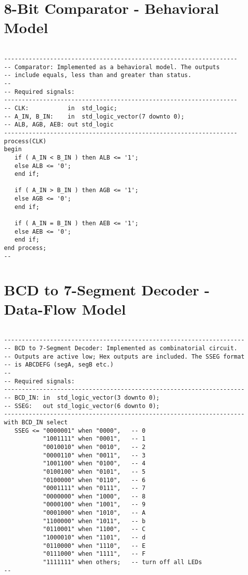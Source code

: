 \section{8-Bit Comparator - Behavioral Model}

\noindent
\begin{minipage}{0.99\linewidth}
\begin{lstlisting}

------------------------------------------------------------------
-- Comparator: Implemented as a behavioral model. The outputs
-- include equals, less than and greater than status.
--
-- Required signals:
------------------------------------------------------------------
-- CLK:           in  std_logic;
-- A_IN, B_IN:    in  std_logic_vector(7 downto 0);
-- ALB, AGB, AEB: out std_logic
------------------------------------------------------------------
process(CLK)
begin
   if ( A_IN < B_IN ) then ALB <= '1';
   else ALB <= '0';
   end if;

   if ( A_IN > B_IN ) then AGB <= '1';
   else AGB <= '0';
   end if;

   if ( A_IN = B_IN ) then AEB <= '1';
   else AEB <= '0';
   end if;
end process;
--
\end{lstlisting}
\end{minipage}

\section{BCD to 7-Segment Decoder - Data-Flow Model}

\noindent
\begin{minipage}{0.99\linewidth}
\begin{lstlisting}

--------------------------------------------------------------------
-- BCD to 7-Segment Decoder: Implemented as combinatorial circuit.
-- Outputs are active low; Hex outputs are included. The SSEG format
-- is ABCDEFG (segA, segB etc.)
--
-- Required signals:
--------------------------------------------------------------------
-- BCD_IN: in  std_logic_vector(3 downto 0);
-- SSEG:   out std_logic_vector(6 downto 0);
--------------------------------------------------------------------
with BCD_IN select
   SSEG <= "0000001" when "0000",   -- 0
           "1001111" when "0001",   -- 1
           "0010010" when "0010",   -- 2
           "0000110" when "0011",   -- 3
           "1001100" when "0100",   -- 4
           "0100100" when "0101",   -- 5
           "0100000" when "0110",   -- 6
           "0001111" when "0111",   -- 7
           "0000000" when "1000",   -- 8
           "0000100" when "1001",   -- 9
           "0001000" when "1010",   -- A
           "1100000" when "1011",   -- b
           "0110001" when "1100",   -- C
           "1000010" when "1101",   -- d
           "0110000" when "1110",   -- E
           "0111000" when "1111",   -- F
           "1111111" when others;   -- turn off all LEDs
--
\end{lstlisting}
\end{minipage}


